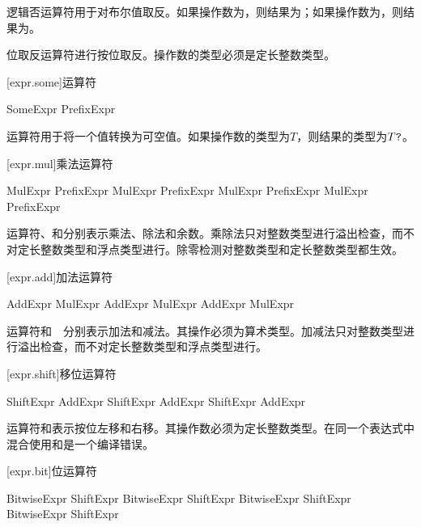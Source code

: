 \pnum
逻辑否运算符\tcode{!}用于对布尔值取反。如果操作数为，则结果为；如果操作数为，则结果为。

\pnum
位取反运算符进行按位取反。操作数的类型必须是定长整数类型。

[expr.some]{运算符}

\begin{bnf}{SomeExpr}
     PrefixExpr
\end{bnf}

\pnum
{}运算符用于将一个值转换为可空值。如果操作数的类型为$T$，则结果的类型为$T\texttt{?}$。

[expr.mul]{乘法运算符}

\begin{bnf}{MulExpr}
    PrefixExpr \br
    MulExpr \terminal{*} PrefixExpr \br
    MulExpr \terminal{/} PrefixExpr \br
    MulExpr \terminal{\%} PrefixExpr
\end{bnf}

\pnum
运算符\tcode{*}、\tcode{/}和\tcode{\%}分别表示乘法、除法和余数。乘除法只对整数类型进行溢出检查，而不对定长整数类型和浮点类型进行。除零检测对整数类型和定长整数类型都生效。

[expr.add]{加法运算符}

\begin{bnf}{AddExpr}
    MulExpr \br
    AddExpr \terminal{+} MulExpr \br
    AddExpr \terminal{-} MulExpr
\end{bnf}

\pnum
运算符\tcode{+}和\ \tcode{-}\ 分别表示加法和减法。其操作必须为算术类型。加减法只对整数类型进行溢出检查，而不对定长整数类型和浮点类型进行。

[expr.shift]{移位运算符}

\begin{bnf}{ShiftExpr}
    AddExpr \br
    ShiftExpr  AddExpr \br
    ShiftExpr  AddExpr
\end{bnf}

\pnum
运算符和表示按位左移和右移。其操作数必须为定长整数类型。在同一个表达式中混合使用和是一个编译错误。

[expr.bit]{位运算符}

\begin{bnf}{BitwiseExpr}
    ShiftExpr \br
    BitwiseExpr  ShiftExpr \br
    BitwiseExpr  ShiftExpr \br
    BitwiseExpr  ShiftExpr
\end{bnf}

